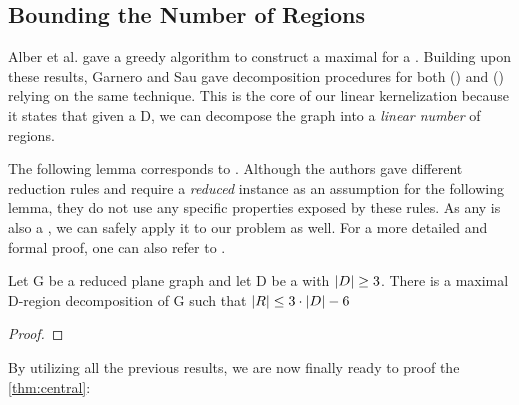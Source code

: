 \subsection{Bounding the Number of Regions}

Alber et al. \cite[Proposition 1]{Alber2004} gave a greedy algorithm to construct a maximal \dreg for a \dom. Building upon these results, Garnero and Sau gave decomposition procedures for both \rbdom (\cite{Garnero2017}) and \tdom (\cite{Garnero2018}) relying on the same technique. This is the core of our linear kernelization because it states that given a \dom D, we can decompose the graph into a \textit{linear number} of regions.


The following lemma corresponds to \cite[Proposition 1 and Lemma 5]{Alber2004}. Although the authors gave different reduction rules and require a \textit{reduced} instance as an assumption for the following lemma, they do not use any specific properties exposed by these rules. 
As any \sdom is also a \dom, we can safely apply it to our problem as well. For a more detailed and formal proof, one can also refer to \cite[Proposition 1]{Garnero2018}.

\begin{lemma}\label{lemma:numRegions}
    Let G be a reduced plane graph and let D be a \sdom with $\abs{D}\geq 3$. There is a maximal D-region decomposition of G such that $\abs{R} \leq 3 \cdot \abs{D} - 6$
\end{lemma}

\begin{lemma}\label{lemma:runtime}
\end{lemma}
\begin{proof} 
\end{proof}

\noindent By utilizing all the previous results, we are now finally ready to proof the \cref{thm:central}: 

\centraltheo*


